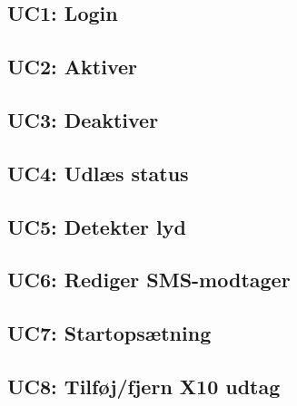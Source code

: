 
\subsection{UC1: Login}



\subsection{UC2: Aktiver}



\subsection{UC3: Deaktiver}



\subsection{UC4: Udlæs status}



\subsection{UC5: Detekter lyd}



\subsection{UC6: Rediger SMS-modtager}



\subsection{UC7: Startopsætning}



\subsection{UC8: Tilføj/fjern X10 udtag}



